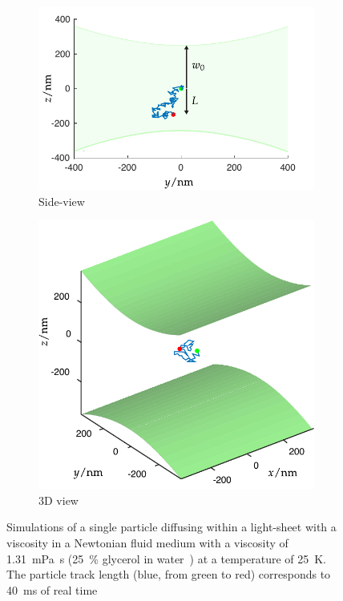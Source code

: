 \begin{figure}
  \centering
  \begin{subfigure}[t]{0.8\linewidth}
    \centering
    \includegraphics{./simulation/size_view_diffusion}
    \caption{Side-view}\label{fig:size_view_diffusion}
  \end{subfigure}
  \begin{subfigure}[t]{0.8\linewidth}
    \centering
    \includegraphics{simulation/size_view_diffusion_3d_bigger}
    \caption{3D view}\label{fig:diffusion_3d}
  \end{subfigure}
  \caption{Simulations of a single particle diffusing within a light-sheet with a viscosity
  in a Newtonian fluid medium with a viscosity of \SI{1.31}{\milli\pascal\second} (\SI{25}{\percent} glycerol in water~\cite{segurViscosityGlycerolIts1951}) at a temperature of \SI{25}{\kelvin}.
  The particle track length (blue, from green to red) corresponds to \SI{40}{\milli\second} of real time}\label{fig:diffusion}
\end{figure}

